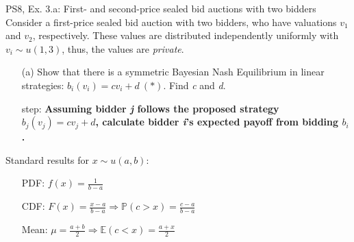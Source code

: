 \begin{frame}{PS8, Ex. 3.a: First- and second-price sealed bid auctions with two bidders}
    Consider a first-price sealed bid auction with two bidders, who have valuations $v_1$ and $v_2$, respectively. These values are distributed independently uniformly with $v_i\sim u(1,3)$, thus, the values are \textit{private}.
    \vspace{-4pt}
    \begin{itemize}
      \item[(a)] Show that there is a symmetric Bayesian Nash Equilibrium in linear strategies: $b_i(v_i) = cv_i + d\ (*)$. Find \textit{c} and \textit{d}.
    \end{itemize}
    \vspace{-8pt}
    \begin{multicols}{2}
      \begin{itemize}
        \item[\nth{1} step:] \textbf{Assuming bidder \textit{j} follows the proposed strategy $b_j(v_j) = cv_j + d$, calculate bidder \textit{i}'s expected payoff from bidding $b_i$.}
      \end{itemize}
      \vfill\null\columnbreak
      Standard results for $x\sim u(a, b):$
      \vspace{-6pt}
      \begin{enumerate}
        \item[PDF:] $f(x)=\frac{1}{b-a}$
        \item[CDF:] $F(x)=\frac{x-a}{b-a}\Rightarrow\mathbb{P}(c>x)=\frac{c-a}{b-a}$
        \item[Mean:] $\mu=\frac{a+b}{2}\Rightarrow\mathbb{E}(c<x)=\frac{a+x}{2}$
      \end{enumerate}
      \vfill\null
    \end{multicols}
\end{frame}
